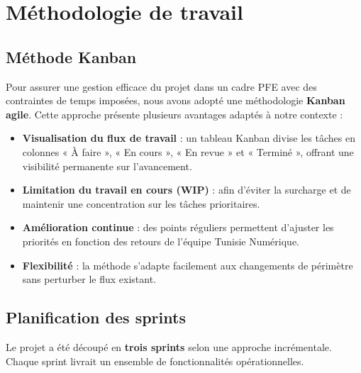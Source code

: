 \documentclass[12pt,a4paper]{report}
\begin{document}
\section{Méthodologie de travail}

\subsection{Méthode Kanban}

Pour assurer une gestion efficace du projet dans un cadre PFE avec des contraintes de
temps imposées, nous avons adopté une méthodologie \textbf{Kanban agile}. Cette approche
présente plusieurs avantages adaptés à notre contexte :

\begin{itemize}
  \item \textbf{Visualisation du flux de travail} : un tableau Kanban divise les tâches en
  colonnes « À faire », « En cours », « En revue » et « Terminé », offrant une visibilité
  permanente sur l'avancement.
  \item \textbf{Limitation du travail en cours (WIP)} : afin d'éviter la surcharge et de
  maintenir une concentration sur les tâches prioritaires.
  \item \textbf{Amélioration continue} : des points réguliers permettent d'ajuster les
  priorités en fonction des retours de l'équipe Tunisie Numérique.
  \item \textbf{Flexibilité} : la méthode s'adapte facilement aux changements de périmètre
  sans perturber le flux existant.
\end{itemize}

\subsection{Planification des sprints}

Le projet a été découpé en \textbf{trois sprints} selon une approche incrémentale.
Chaque sprint livrait un ensemble de fonctionnalités opérationnelles.
\end{document}

